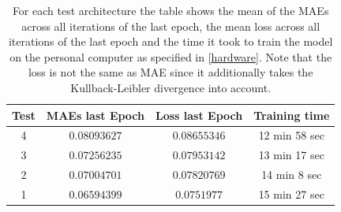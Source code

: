 \begin{center}
    \begin{table}[H]
        \centering
        \begin{tabular}{ | c | c | c | c | }
            \hline
            Test &MAEs last Epoch & Loss last Epoch & Training time\\ \hline
            4 & $0.08093627$  & $0.08655346$  & 12 min 58 sec  \\
            3 & $0.07256235$  & $0.07953142$  & 13 min 17 sec  \\
            2 & $0.07004701$  & $0.07820769$  & 14 min 8 sec  \\  
            1 & $0.06594399$  & $0.0751977$  & 15 min 27 sec  \\  
            \hline
        \end{tabular} 
        \caption{For each test architecture the table shows the mean of the MAEs across all iterations of the last
        epoch, the mean loss across all iterations of the last epoch and the time it took to train the model
        on the personal computer as specified in \autoref{hardware}. Note that the loss is not the same
        as MAE since it additionally takes the Kullback-Leibler divergence into account.}  \label{table_mae_1}
    \end{table}
\end{center}


